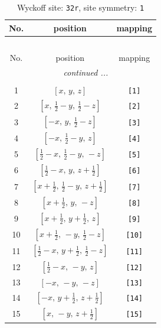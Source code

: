 \documentclass[fleqn,8pt]{jsarticle}
\begin{document}
\renewcommand{\arraystretch}{1.2}
\begin{longtable}{ccc}
\caption{Wyckoff site: {\tt 32r}, site symmetry: {\tt 1}}
 \\
 \hline \hline
No. & position & mapping \\ \hline \endfirsthead

\multicolumn{2}{l}{\tablename\ \thetable{}} \\
 \hline \hline
No. & position & mapping \\ \hline \endhead

 \hline \hline
\multicolumn{2}{r}{\footnotesize\it continued ...} \\ \endfoot

 \hline \hline
\multicolumn{2}{r}{} \\ \endlastfoot

1 & $\left[ x,\, y,\, z \right]$ & {\tt [1]} \\ \hline
2 & $\left[ x,\, \frac{1}{2} - y,\, \frac{1}{2} - z \right]$ & {\tt [2]} \\ \hline
3 & $\left[ - x,\, y,\, \frac{1}{2} - z \right]$ & {\tt [3]} \\ \hline
4 & $\left[ - x,\, \frac{1}{2} - y,\, z \right]$ & {\tt [4]} \\ \hline
5 & $\left[ \frac{1}{2} - x,\, \frac{1}{2} - y,\, - z \right]$ & {\tt [5]} \\ \hline
6 & $\left[ \frac{1}{2} - x,\, y,\, z + \frac{1}{2} \right]$ & {\tt [6]} \\ \hline
7 & $\left[ x + \frac{1}{2},\, \frac{1}{2} - y,\, z + \frac{1}{2} \right]$ & {\tt [7]} \\ \hline
8 & $\left[ x + \frac{1}{2},\, y,\, - z \right]$ & {\tt [8]} \\ \hline
9 & $\left[ x + \frac{1}{2},\, y + \frac{1}{2},\, z \right]$ & {\tt [9]} \\ \hline
10 & $\left[ x + \frac{1}{2},\, - y,\, \frac{1}{2} - z \right]$ & {\tt [10]} \\ \hline
11 & $\left[ \frac{1}{2} - x,\, y + \frac{1}{2},\, \frac{1}{2} - z \right]$ & {\tt [11]} \\ \hline
12 & $\left[ \frac{1}{2} - x,\, - y,\, z \right]$ & {\tt [12]} \\ \hline
13 & $\left[ - x,\, - y,\, - z \right]$ & {\tt [13]} \\ \hline
14 & $\left[ - x,\, y + \frac{1}{2},\, z + \frac{1}{2} \right]$ & {\tt [14]} \\ \hline
15 & $\left[ x,\, - y,\, z + \frac{1}{2} \right]$ & {\tt [15]} \\ \hline

\end{longtable}
\end{document}
